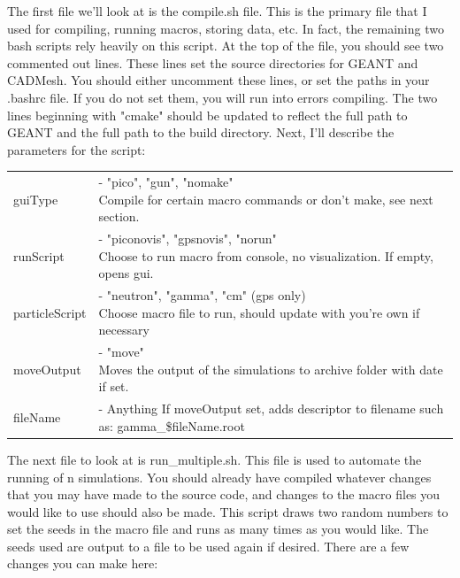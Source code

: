 \documentclass[%
12pt,
twoside,
reprint,
amsmath,amssymb,
aps,
]{article}
\begin{document}
	\par The first file we'll look at is the compile.sh file. This is the primary file that I used for compiling, running macros, storing data, etc. In fact, the remaining two bash scripts rely heavily on this script. At the top of the file, you should see two commented out lines. These lines set the source directories for GEANT and CADMesh. You should either uncomment these lines, or set the paths in your .bashrc file. If you do not set them, you will run into errors compiling. The two lines beginning with "cmake" should be updated to reflect the full path to GEANT and the full path to the build directory. Next, I'll describe the parameters for the script:
	\begin{table}[!h]
		\begin{tabular}{ll}
			guiType & \makecell[l]{- "pico", "gun", "nomake" \\
			\indent Compile for certain macro commands or don't make, see next section.}\\
			runScript & \makecell[l]{- "piconovis", "gpsnovis", "norun" \\
			\indent Choose to run macro from console, no visualization. If empty, opens gui.}\\ 
			particleScript & \makecell[l]{- "neutron", "gamma", "cm" (gps only) \\
			\indent Choose macro file to run, should update with you're own if necessary} \\
			moveOutput & \makecell[l]{- "move" \\
			\indent Moves the output of the simulations to archive folder with date if set.} \\
			fileName & \makecell[l]{- Anything \\
			\indent If moveOutput set, adds descriptor to filename such as: gamma\_\$fileName.root}
		\end{tabular}
	\end{table}

	\par The next file to look at is run\_multiple.sh. This file is used to automate the running of n simulations. You should already have compiled whatever changes that you may have made to the source code, and changes to the macro files you would like to use should also be made. This script draws two random numbers to set the seeds in the macro file and runs as many times as you would like. The seeds used are output to a file to be used again if desired. There are a few changes you can make here: \\
	
\end{document}
